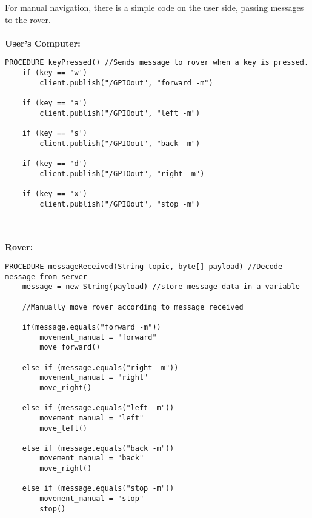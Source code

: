 \documentclass[11pt]{report}
\begin{document}
For manual navigation, there is a simple code on the user side, passing messages to the rover.
\\\\
\textbf{User's Computer:}
\begin{lstlisting}
PROCEDURE keyPressed() //Sends message to rover when a key is pressed.
	if (key == 'w') 
		client.publish("/GPIOout", "forward -m")
  
	if (key == 'a') 
		client.publish("/GPIOout", "left -m")
  
	if (key == 's') 
		client.publish("/GPIOout", "back -m")
  
	if (key == 'd') 
		client.publish("/GPIOout", "right -m")
 
	if (key == 'x') 
		client.publish("/GPIOout", "stop -m")
\end{lstlisting}
\noindent
\\\\
\textbf{Rover:}
\begin{lstlisting}
PROCEDURE messageReceived(String topic, byte[] payload) //Decode message from server
	message = new String(payload) //store message data in a variable
	
	//Manually move rover according to message received
	
	if(message.equals("forward -m")) 
		movement_manual = "forward"
		move_forward()
  
	else if (message.equals("right -m")) 
		movement_manual = "right"
  		move_right()
  
	else if (message.equals("left -m")) 
		movement_manual = "left"
  		move_left()
  
	else if (message.equals("back -m")) 
		movement_manual = "back"
  		move_right()
  
	else if (message.equals("stop -m")) 
		movement_manual = "stop"
		stop()
\end{lstlisting}
\end{document}
